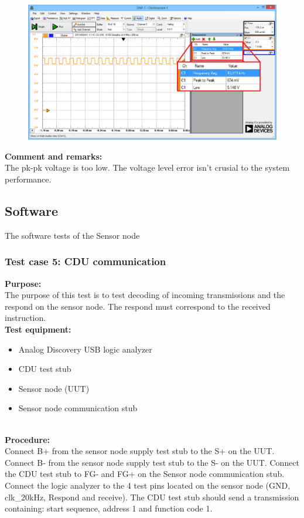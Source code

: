 \begin{figure}[H]
	\centering
	\includegraphics[width=.9\textwidth]{billeder/SN_case_4_osc_picture}
\end{figure}

\textbf{Comment and remarks:}\\
The pk-pk voltage is too low. The voltage level error isn't crusial to the system performance.\\

\subsection{Software}
The software tests of the Sensor node

\subsubsection{Test case 5: CDU communication}
\textbf{Purpose:}\\
The purpose of this test is to test decoding of incoming transmissions and the respond on the sensor node. The respond must correspond to the received instruction.\\

\textbf{Test equipment:}
\begin{itemize}
	\item Analog Discovery USB logic analyzer
	\item CDU test stub
	\item Sensor node (UUT)
	\item Sensor node communication stub
\end{itemize}
\ \\
\textbf{Procedure:}\\
Connect B+ from the sensor node supply test stub to the S+ on the UUT. Connect B- from the sensor node supply test stub to the S- on the UUT.
Connect the CDU test stub to FG- and FG+ on the Sensor node communication stub.\\ 
Connect the logic analyzer to the 4 test pins located on the sensor node (GND, clk\_20kHz, Respond and receive).
The CDU test stub should send a transmission containing: start sequence, address 1 and function code 1.

